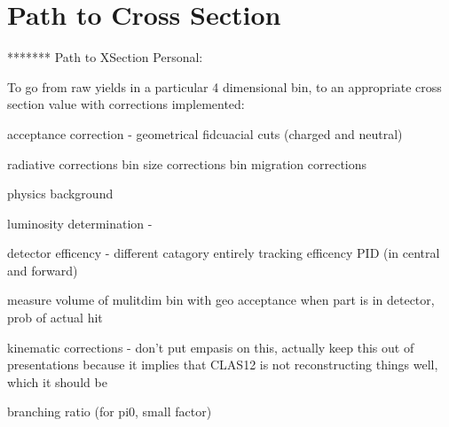 \section{Path to Cross Section}
*******
Path to XSection Personal:

To go from raw yields in a particular 4 dimensional bin, to an appropriate cross section value with corrections implemented:


acceptance correction - geometrical
    fidcuacial cuts (charged and neutral)


radiative corrections
bin size corrections
bin migration corrections

physics background

luminosity determination -

detector efficency - different catagory entirely
tracking efficency 
PID (in central and forward)

measure volume of mulitdim bin with geo acceptance
when part is in detector, prob of actual hit


kinematic corrections - don't put empasis on this, actually keep this out of presentations because it implies that CLAS12 is not reconstructing things well, which it should be

branching ratio (for pi0, small factor)





